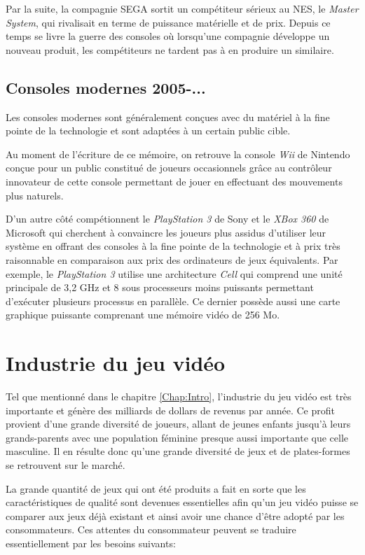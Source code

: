 \documentclass[12pt,twoside,letterpaper,francais]{book}
\begin{document}
Par la suite, la compagnie SEGA sortit un compétiteur sérieux au NES,
le \textit{Master System}, qui rivalisait en terme de puissance
matérielle et de prix. Depuis ce temps se livre la guerre des consoles
où lorsqu'une compagnie développe un nouveau produit, les compétiteurs
ne tardent pas à en produire un similaire.


\FloatBarrier
\subsection{Consoles modernes 2005-...}
Les consoles modernes sont généralement conçues avec du matériel à la
fine pointe de la technologie et sont adaptées à un certain public
cible.

Au moment de l'écriture de ce mémoire, on retrouve la console
\textit{Wii} de Nintendo conçue pour un public constitué de joueurs
occasionnels grâce au contrôleur innovateur de cette console
permettant de jouer en effectuant des mouvements plus naturels.

D'un autre côté compétionnent le \textit{PlayStation 3} de Sony et le
\textit{XBox 360} de Microsoft qui cherchent à convaincre les joueurs
plus assidus d'utiliser leur système en offrant des consoles à la fine
pointe de la technologie et à prix très raisonnable en comparaison aux
prix des ordinateurs de jeux équivalents. Par exemple, le
\textit{PlayStation 3} utilise une architecture \textit{Cell} qui
comprend une unité principale de 3,2 GHz et 8 sous processeurs moins
puissants permettant d'exécuter plusieurs processus en parallèle. Ce
dernier possède aussi une carte graphique puissante comprenant une
mémoire vidéo de 256 Mo.


\FloatBarrier
\section{Industrie du jeu vidéo}
Tel que mentionné dans le chapitre \ref{Chap:Intro}, l'industrie du
jeu vidéo est très importante et génère des milliards de dollars de
revenus par année. Ce profit provient d'une grande diversité de
joueurs, allant de jeunes enfants jusqu'à leurs grands-parents avec
une population féminine presque aussi importante que celle
masculine. Il en résulte donc qu'une grande diversité de jeux et de
plates-formes se retrouvent sur le marché.

La grande quantité de jeux qui ont été produits a fait en sorte que
les caractéristiques de qualité sont devenues essentielles afin qu'un
jeu vidéo puisse se comparer aux jeux déjà existant et ainsi avoir une
chance d'être adopté par les consommateurs. Ces attentes du
consommateur peuvent se traduire essentiellement par les besoins
suivants:
\end{document}
